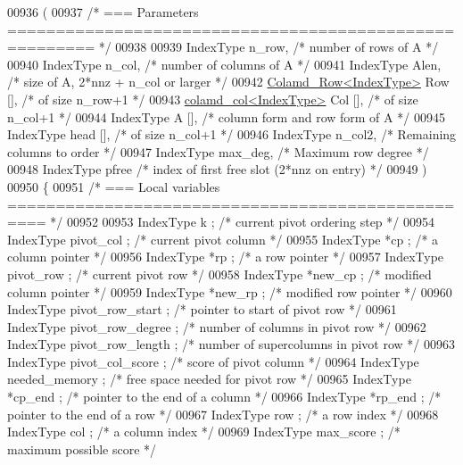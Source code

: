 \begin{DoxyCode}
{{{{{{{{{{{{{{{{{00936   (
00937     \textcolor{comment}{/* === Parameters ======================================================= */}
00938 
00939     IndexType n\_row,      \textcolor{comment}{/* number of rows of A */}
00940     IndexType n\_col,      \textcolor{comment}{/* number of columns of A */}
00941     IndexType Alen,     \textcolor{comment}{/* size of A, 2*nnz + n\_col or larger */}
00942     \hyperlink{structinternal_1_1_colamd___row}{Colamd\_Row<IndexType>} Row [],    \textcolor{comment}{/* of size n\_row+1 */}
00943     \hyperlink{structinternal_1_1colamd__col}{colamd\_col<IndexType>} Col [],    \textcolor{comment}{/* of size n\_col+1 */}
00944     IndexType A [],     \textcolor{comment}{/* column form and row form of A */}
00945     IndexType head [],    \textcolor{comment}{/* of size n\_col+1 */}
00946     IndexType n\_col2,     \textcolor{comment}{/* Remaining columns to order */}
00947     IndexType max\_deg,    \textcolor{comment}{/* Maximum row degree */}
00948     IndexType pfree     \textcolor{comment}{/* index of first free slot (2*nnz on entry) */}
00949     )
00950 \{
00951   \textcolor{comment}{/* === Local variables ================================================== */}
00952 
00953   IndexType k ;     \textcolor{comment}{/* current pivot ordering step */}
00954   IndexType pivot\_col ;   \textcolor{comment}{/* current pivot column */}
00955   IndexType *cp ;     \textcolor{comment}{/* a column pointer */}
00956   IndexType *rp ;     \textcolor{comment}{/* a row pointer */}
00957   IndexType pivot\_row ;   \textcolor{comment}{/* current pivot row */}
00958   IndexType *new\_cp ;   \textcolor{comment}{/* modified column pointer */}
00959   IndexType *new\_rp ;   \textcolor{comment}{/* modified row pointer */}
00960   IndexType pivot\_row\_start ; \textcolor{comment}{/* pointer to start of pivot row */}
00961   IndexType pivot\_row\_degree ;  \textcolor{comment}{/* number of columns in pivot row */}
00962   IndexType pivot\_row\_length ;  \textcolor{comment}{/* number of supercolumns in pivot row */}
00963   IndexType pivot\_col\_score ; \textcolor{comment}{/* score of pivot column */}
00964   IndexType needed\_memory ;   \textcolor{comment}{/* free space needed for pivot row */}
00965   IndexType *cp\_end ;   \textcolor{comment}{/* pointer to the end of a column */}
00966   IndexType *rp\_end ;   \textcolor{comment}{/* pointer to the end of a row */}
00967   IndexType row ;     \textcolor{comment}{/* a row index */}
00968   IndexType col ;     \textcolor{comment}{/* a column index */}
00969   IndexType max\_score ;   \textcolor{comment}{/* maximum possible score */}
}}}}}}}}}}}}}}}}}
\end{DoxyCode}
